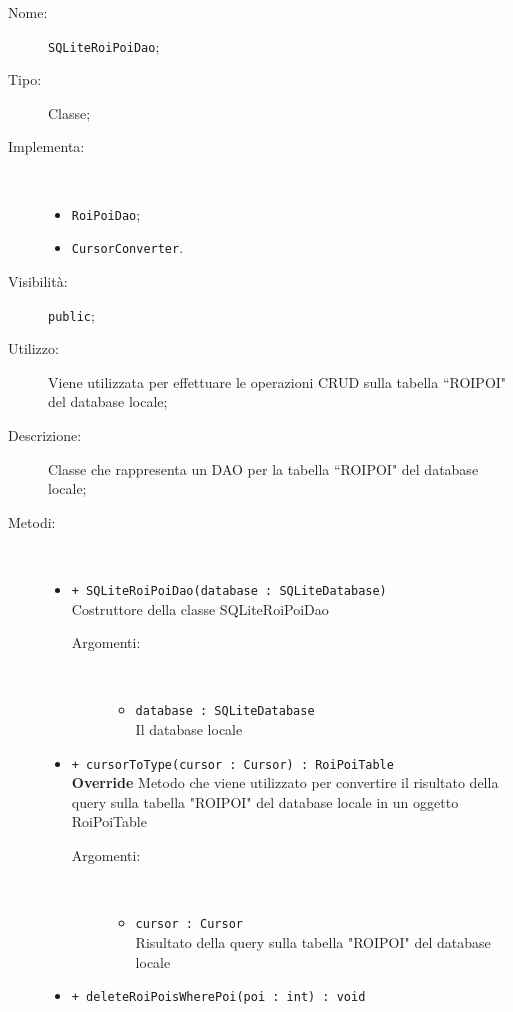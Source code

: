 \documentclass[../DefinizioneDiProdotto.tex]{subfiles}
\begin{document}
\begin{description}
	\item[Nome:] \texttt{SQLiteRoiPoiDao};
	\item[Tipo:] Classe;
	\item[Implementa:] \
	\begin{itemize}
		\item \texttt{RoiPoiDao};
		
		\item \texttt{CursorConverter}.
		
	\end{itemize}
	\item[Visibilità:] \texttt{public};
	\item[Utilizzo:] Viene utilizzata per effettuare le operazioni CRUD sulla tabella “ROIPOI" del database locale;
	\item[Descrizione:] Classe che rappresenta un DAO per la tabella “ROIPOI" del database locale;
	\item[Metodi:] \
	\begin{itemize}
		\item \texttt{+ SQLiteRoiPoiDao(database : SQLiteDatabase)}\\
		Costruttore della classe SQLiteRoiPoiDao
		\begin{description}
			\item[Argomenti:] \
			\begin{itemize}
				\item \texttt{database : SQLiteDatabase}\\
				Il database locale\end{itemize}
		\end{description}
		\item \texttt{+ cursorToType(cursor : Cursor) : RoiPoiTable}\\
		\textbf{Override} Metodo che viene utilizzato per convertire il risultato della query sulla tabella "ROIPOI" del database locale in un oggetto RoiPoiTable
		\begin{description}
			\item[Argomenti:] \
			\begin{itemize}
				\item \texttt{cursor : Cursor}\\
				Risultato della query sulla tabella "ROIPOI" del database locale\end{itemize}
		\end{description}
		\item \texttt{+ deleteRoiPoisWherePoi(poi : int) : void}\\

\end{itemize}
\end{description}
\end{document}
